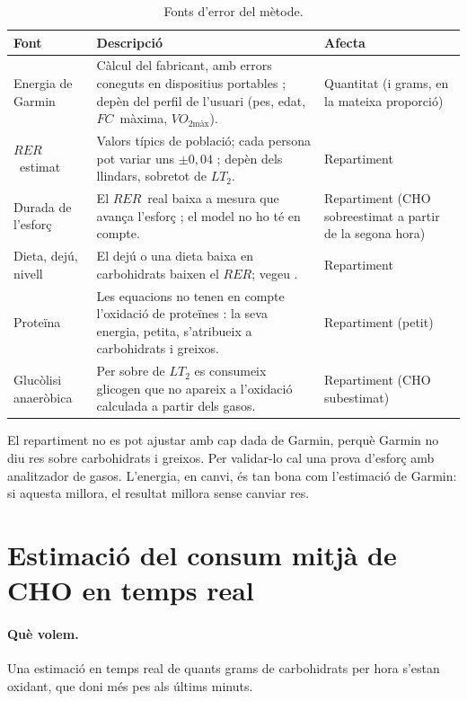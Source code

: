 \documentclass[10pt,a4paper]{article}
\newcommand{\smax}{{\scriptscriptstyle\text{màx}}}
\newcommand{\VOmax}{\ensuremath{\mathit{VO}_{2\smax}}}
\newcommand{\RER}{\ensuremath{\mathit{RER}}}
\newcommand{\FC}{\ensuremath{\mathit{FC}}}
\begin{document}
\begin{table}[H]
\centering
\caption{Fonts d'error del mètode.}
\label{tab:errors}
\small
\begin{tabularx}{\textwidth}{@{}>{\raggedright\arraybackslash}p{3.6cm} L >{\raggedright\arraybackslash}p{2.4cm}@{}}
\toprule
Font & Descripció & Afecta \\
\midrule
Energia de Garmin & Càlcul del fabricant, amb errors coneguts en dispositius
portables \citep{shcherbina2017,fuller2020}; depèn del perfil de l'usuari (pes, edat,
\FC\ màxima, $\VOmax$). & Quantitat (i grams, en la mateixa proporció) \\
\RER\ estimat & Valors típics de població; cada persona pot variar uns $\pm0{,}04$
\citep{goedecke2000}; depèn dels llindars, sobretot de $LT_2$. & Repartiment \\
Durada de l'esforç & El \RER\ real baixa a mesura que avança l'esforç
\citep{rothschild2022}; el model no ho té en compte. & Repartiment (CHO sobreestimat a
partir de la segona hora) \\
Dieta, dejú, nivell & El dejú o una dieta baixa en carbohidrats baixen el \RER; vegeu
\citep{chofatfc2026}. & Repartiment \\
Proteïna & Les equacions no tenen en compte l'oxidació de proteïnes
\citep{frayn1983,jeukendrup2005}: la seva energia, petita, s'atribueix a carbohidrats i
greixos. & Repartiment (petit) \\
Glucòlisi anaeròbica & Per sobre de $LT_2$ es consumeix glicogen que no apareix a
l'oxidació calculada a partir dels gasos. & Repartiment (CHO subestimat) \\
\bottomrule
\end{tabularx}
\end{table}

El repartiment no es pot ajustar amb cap dada de Garmin, perquè Garmin no diu res sobre
carbohidrats i greixos. Per validar-lo cal una prova d'esforç amb analitzador de gasos.
L'energia, en canvi, és tan bona com l'estimació de Garmin: si aquesta millora, el resultat
millora sense canviar res.

\section{Estimació del consum mitjà de CHO en temps real}\label{sec:implementacio}

\paragraph{Què volem.} Una estimació en temps real de quants grams de carbohidrats per hora
s'estan oxidant, que doni més pes als últims minuts.
\end{document}
